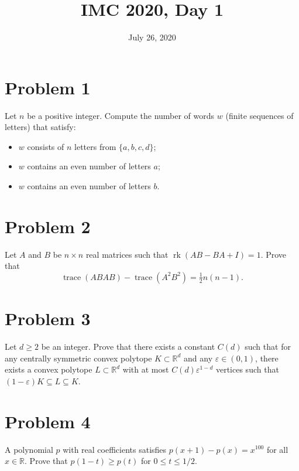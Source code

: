 \documentclass{article}
\title{IMC 2020, Day 1}
\date{July 26, 2020}
\begin{document}
\maketitle

\section*{Problem 1}
Let $n$ be a positive integer. Compute the number of words $w$ (finite sequences of letters) that satisfy:
\begin{itemize}
\item[(1)] $w$ consists of $n$ letters from $\{a, b, c, d\}$;
\item[(2)] $w$ contains an even number of letters $a$;
\item[(3)] $w$ contains an even number of letters $b$.
\end{itemize}

\section*{Problem 2}
Let $A$ and $B$ be $n \times n$ real matrices such that $\operatorname{rk}(AB - BA + I) = 1$. Prove that
\[ \operatorname{trace}(ABAB) - \operatorname{trace}(A^2 B^2) = \tfrac{1}{2} n(n-1). \]

\section*{Problem 3}
Let $d \geq 2$ be an integer. Prove that there exists a constant $C(d)$ such that for any centrally symmetric convex polytope $K \subset \mathbb{R}^d$ and any $\varepsilon \in (0, 1)$, there exists a convex polytope $L \subset \mathbb{R}^d$ with at most $C(d) \varepsilon^{1-d}$ vertices such that $(1 - \varepsilon) K \subseteq L \subseteq K$.

\section*{Problem 4}
A polynomial $p$ with real coefficients satisfies $p(x+1) - p(x) = x^{100}$ for all $x \in \mathbb{R}$. Prove that $p(1-t) \geq p(t)$ for $0 \leq t \leq 1/2$.
\end{document}
